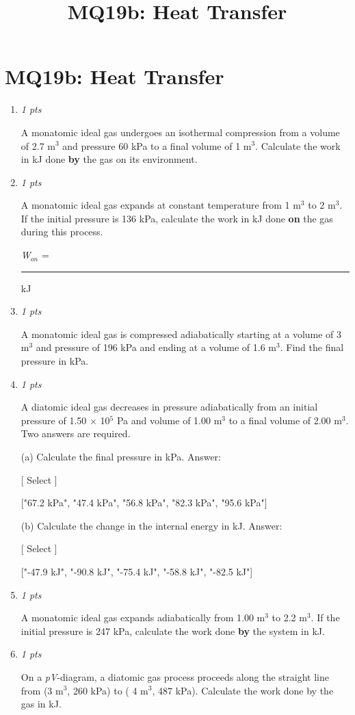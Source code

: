 \documentclass[11pt]{article}
\title{MQ19b: Heat Transfer}
\author{}
\date{}
\begin{document}
\maketitle

\section*{MQ19b: Heat Transfer}

\begin{enumerate}[leftmargin=*,label=\textbf{Question \arabic*.}]

\item \hfill \textit{1 pts}

A monatomic ideal gas undergoes an isothermal compression from a volume of 2.7 m$^{3}$ and pressure 60 kPa to a final volume of 1 m$^{3}$. Calculate the work in kJ done \textbf{by} the gas on its environment.

\item \hfill \textit{1 pts}

A monatomic ideal gas expands at constant temperature from 1 m$^{3}$ to 2 m$^{3}$. If the initial pressure is 136 kPa, calculate the work in kJ done \textbf{on} the gas during this process.



\emph{W}$_{on}$ = \rule{2.5cm}{0.4pt} kJ

\item \hfill \textit{1 pts}

A monatomic ideal gas is compressed adiabatically starting at a volume of 3 m$^{3}$ and pressure of 196 kPa and ending at a volume of 1.6 m$^{3}$. Find the final pressure in kPa.

\item \hfill \textit{1 pts}

A diatomic ideal gas decreases in pressure adiabatically from an initial pressure of 1.50 × 10$^{5}$ Pa and volume of 1.00 m$^{3}$ to a final volume of 2.00 m$^{3}$.  Two answers are required.

(a) Calculate the final pressure in kPa. Answer:

    [ Select ]

  ["67.2 kPa", "47.4 kPa", "56.8 kPa", "82.3 kPa", "95.6 kPa"]

(b) Calculate the change in the internal energy in kJ. Answer:

    [ Select ]

  ["-47.9 kJ", "-90.8 kJ", "-75.4 kJ", "-58.8 kJ", "-82.5 kJ"]

\item \hfill \textit{1 pts}

A monatomic ideal gas expands adiabatically from 1.00 m$^{3}$ to 2.2 m$^{3}$. If the initial pressure is 247 kPa, calculate the work done \textbf{by} the system in kJ.

\item \hfill \textit{1 pts}

On a \emph{pV}-diagram, a diatomic gas process proceeds along the straight line from (3 m$^{3}$, 260 kPa) to ( 4 m$^{3}$, 487 kPa). Calculate the work done by the gas in kJ.

\end{enumerate}
\end{document}
